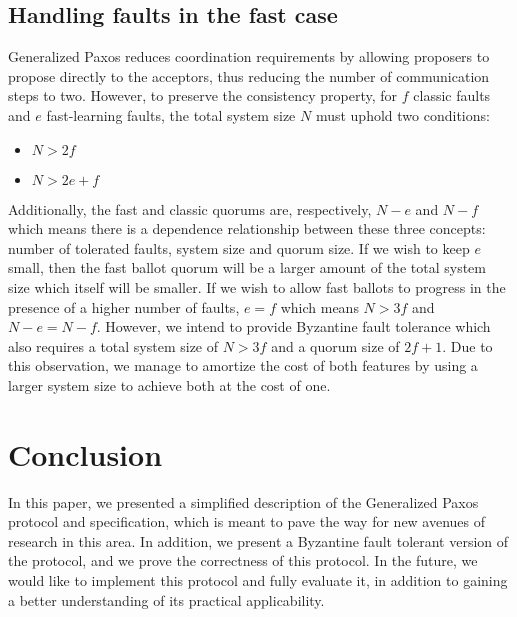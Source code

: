 

\subsection{Handling faults in the fast case}

Generalized Paxos reduces coordination requirements by allowing proposers to propose directly to the acceptors, thus reducing the number of communication steps to two. However, to preserve the consistency property, for $f$ classic faults and $e$ fast-learning faults, the total system size $N$ must uphold two conditions:
\begin{itemize}
	\item $N > 2f$
	\item $N > 2e+f$
\end{itemize} 
Additionally, the fast and classic quorums are, respectively, $N-e$ and $N-f$ which means there is a dependence relationship between these three concepts: number of tolerated faults, system size and quorum size. If we wish to keep $e$ small, then the fast ballot quorum will be a larger amount of the total system size which itself will be smaller. If we wish to allow fast ballots to progress in the presence of a higher number of faults, $e=f$ which means $N >3f$ and $N-e=N-f$. However, we intend to provide Byzantine fault tolerance which also requires a total system size of $N>3f$ and a quorum size of $2f+1$. Due to this observation, we manage to amortize the cost of both features by using a larger system size to achieve both at the cost of one. \par



\section{Conclusion}

In this paper, we presented a simplified description of the Generalized Paxos protocol and specification, which is meant to pave the way for new avenues of research in this area. In addition, we present a Byzantine fault tolerant version of the protocol, and we prove the correctness of this protocol. In the future, we would like to implement this protocol and fully evaluate it, in addition to gaining a better understanding of its practical applicability.
